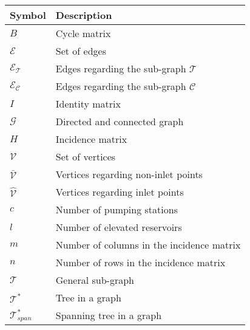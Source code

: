 \begin{tabular}{l l} 
	\textbf{Symbol}		&	\textbf{Description}										\\\hline
	$B$		&	Cycle matrix		    												\\
	$\mathcal{E}$		&	Set of edges		    									\\
	$\mathcal{E_T}$		&	Edges regarding the sub-graph $\mathcal{T}$ 		    	\\
	$\mathcal{E_C}$		&	Edges regarding the sub-graph $\mathcal{C}$ 		    	\\
	$I$					&	Identity matrix		    									\\
	$\mathcal{G}$		&	Directed and connected graph								\\
	$H$		&	Incidence matrix		    											\\
	$\mathcal{V}$		&	Set of vertices		    									\\
	$\bar{\mathcal{V}}$ &	Vertices regarding non-inlet points	    					\\
	$\hat{\mathcal{V}}$ &	Vertices regarding inlet points	    						\\
	$c$		&	Number of pumping stations												\\
	$l$		&	Number of elevated reservoirs											\\
	$m$		&	Number of columns in the incidence matrix								\\
	$n$		&	Number of rows in the incidence matrix									\\
	$\mathcal{T}$		&	General sub-graph 		    								\\
	$\mathcal{T^*}$		&	Tree in a graph		    									\\
	$\mathcal{T}^*_{span}$		&	Spanning tree in a graph	    					\\



\end{tabular}	

	


